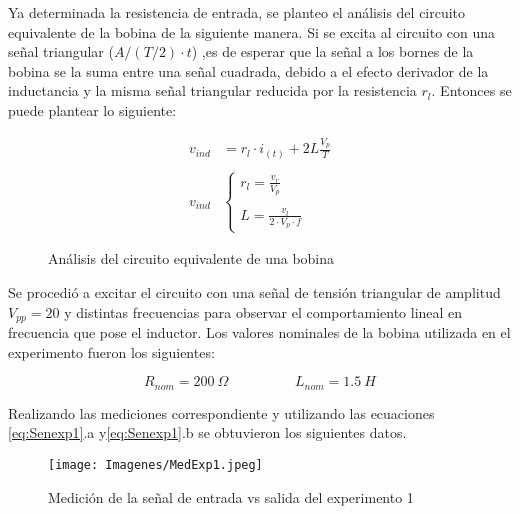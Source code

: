 Ya determinada la resistencia de entrada, se planteo el análisis del circuito equivalente de la bobina de la siguiente manera. Si se excita al circuito con una señal triangular ($A/(T/2)\cdot t$) ,es de esperar que la señal a los bornes de la bobina se la suma entre una señal cuadrada, debido a el efecto derivador de la inductancia y la misma señal triangular reducida por la resistencia $r_l$. Entonces se puede plantear lo siguiente:
\begin{figure}[H]
    \centering
    \begin{minipage}{0.49\textwidth}
        
        \label{fig:enter-label}
    \end{minipage}
    \begin{minipage}{0.49\textwidth}
        \begin{equation}\label{eq:Senexp1}
        \begin{aligned}
            v_{ind}&=r_l\cdot i_{(t)}+2L\frac{V_p}{T}\\
            \\
        v_{ind}&\begin{cases}
            r_l=\frac{v_r}{V_p}\\
            \\
            L=\frac{v_l}{2\cdot V_p \cdot f}
        \end{cases}
        \end{aligned}
    \end{equation}
\end{minipage}
\caption{Análisis del circuito equivalente de una bobina}
\end{figure}


Se procedió a excitar el circuito con una señal de tensión triangular de amplitud $V_{pp}=20$ y distintas frecuencias para observar el comportamiento lineal en frecuencia que pose el inductor.
Los valores nominales de la bobina utilizada en el experimento fueron los siguientes:

\begin{equation*}
    R_{nom} = 200 ~\Omega  
    \hspace{2cm}
    L_{nom} = 1.5 ~H
\end{equation*}

Realizando las mediciones correspondiente y utilizando las ecuaciones \ref{eq:Senexp1}.a y\ref{eq:Senexp1}.b se obtuvieron los siguientes datos.
\begin{figure}[H]
    \centering
    \texttt{[image: Imagenes/MedExp1.jpeg]}
    \caption{Medición de la señal de entrada vs salida del experimento 1}
\end{figure}

